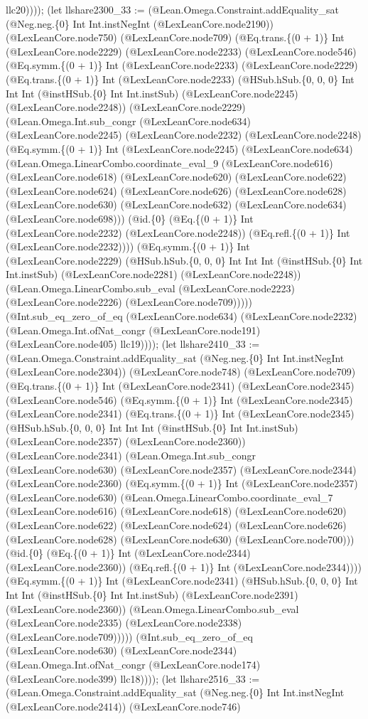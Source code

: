 \documentclass[11pt]{article}
\begin{document}
llc20)))); (let llshare2300\_33 := (@Lean.Omega.Constraint.addEquality\_sat (@Neg.neg.\{0\} Int Int.instNegInt (@LexLeanCore.node2190)) (@LexLeanCore.node750) (@LexLeanCore.node709) (@Eq.trans.\{(0 + 1)\} Int (@LexLeanCore.node2229) (@LexLeanCore.node2233) (@LexLeanCore.node546) (@Eq.symm.\{(0 + 1)\} Int (@LexLeanCore.node2233) (@LexLeanCore.node2229) (@Eq.trans.\{(0 + 1)\} Int (@LexLeanCore.node2233) (@HSub.hSub.\{0, 0, 0\} Int Int Int (@instHSub.\{0\} Int Int.instSub) (@LexLeanCore.node2245) (@LexLeanCore.node2248)) (@LexLeanCore.node2229) (@Lean.Omega.Int.sub\_congr (@LexLeanCore.node634) (@LexLeanCore.node2245) (@LexLeanCore.node2232) (@LexLeanCore.node2248) (@Eq.symm.\{(0 + 1)\} Int (@LexLeanCore.node2245) (@LexLeanCore.node634) (@Lean.Omega.LinearCombo.coordinate\_eval\_9 (@LexLeanCore.node616) (@LexLeanCore.node618) (@LexLeanCore.node620) (@LexLeanCore.node622) (@LexLeanCore.node624) (@LexLeanCore.node626) (@LexLeanCore.node628) (@LexLeanCore.node630) (@LexLeanCore.node632) (@LexLeanCore.node634) (@LexLeanCore.node698))) (@id.\{0\} (@Eq.\{(0 + 1)\} Int (@LexLeanCore.node2232) (@LexLeanCore.node2248)) (@Eq.refl.\{(0 + 1)\} Int (@LexLeanCore.node2232)))) (@Eq.symm.\{(0 + 1)\} Int (@LexLeanCore.node2229) (@HSub.hSub.\{0, 0, 0\} Int Int Int (@instHSub.\{0\} Int Int.instSub) (@LexLeanCore.node2281) (@LexLeanCore.node2248)) (@Lean.Omega.LinearCombo.sub\_eval (@LexLeanCore.node2223) (@LexLeanCore.node2226) (@LexLeanCore.node709))))) (@Int.sub\_eq\_zero\_of\_eq (@LexLeanCore.node634) (@LexLeanCore.node2232) (@Lean.Omega.Int.ofNat\_congr (@LexLeanCore.node191) (@LexLeanCore.node405) llc19)))); (let llshare2410\_33 := (@Lean.Omega.Constraint.addEquality\_sat (@Neg.neg.\{0\} Int Int.instNegInt (@LexLeanCore.node2304)) (@LexLeanCore.node748) (@LexLeanCore.node709) (@Eq.trans.\{(0 + 1)\} Int (@LexLeanCore.node2341) (@LexLeanCore.node2345) (@LexLeanCore.node546) (@Eq.symm.\{(0 + 1)\} Int (@LexLeanCore.node2345) (@LexLeanCore.node2341) (@Eq.trans.\{(0 + 1)\} Int (@LexLeanCore.node2345) (@HSub.hSub.\{0, 0, 0\} Int Int Int (@instHSub.\{0\} Int Int.instSub) (@LexLeanCore.node2357) (@LexLeanCore.node2360)) (@LexLeanCore.node2341) (@Lean.Omega.Int.sub\_congr (@LexLeanCore.node630) (@LexLeanCore.node2357) (@LexLeanCore.node2344) (@LexLeanCore.node2360) (@Eq.symm.\{(0 + 1)\} Int (@LexLeanCore.node2357) (@LexLeanCore.node630) (@Lean.Omega.LinearCombo.coordinate\_eval\_7 (@LexLeanCore.node616) (@LexLeanCore.node618) (@LexLeanCore.node620) (@LexLeanCore.node622) (@LexLeanCore.node624) (@LexLeanCore.node626) (@LexLeanCore.node628) (@LexLeanCore.node630) (@LexLeanCore.node700))) (@id.\{0\} (@Eq.\{(0 + 1)\} Int (@LexLeanCore.node2344) (@LexLeanCore.node2360)) (@Eq.refl.\{(0 + 1)\} Int (@LexLeanCore.node2344)))) (@Eq.symm.\{(0 + 1)\} Int (@LexLeanCore.node2341) (@HSub.hSub.\{0, 0, 0\} Int Int Int (@instHSub.\{0\} Int Int.instSub) (@LexLeanCore.node2391) (@LexLeanCore.node2360)) (@Lean.Omega.LinearCombo.sub\_eval (@LexLeanCore.node2335) (@LexLeanCore.node2338) (@LexLeanCore.node709))))) (@Int.sub\_eq\_zero\_of\_eq (@LexLeanCore.node630) (@LexLeanCore.node2344) (@Lean.Omega.Int.ofNat\_congr (@LexLeanCore.node174) (@LexLeanCore.node399) llc18)))); (let llshare2516\_33 := (@Lean.Omega.Constraint.addEquality\_sat (@Neg.neg.\{0\} Int Int.instNegInt (@LexLeanCore.node2414)) (@LexLeanCore.node746) 
\end{document}

